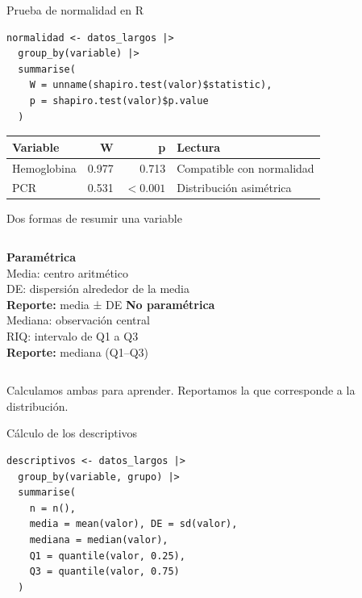 \documentclass[aspectratio=169,11pt]{beamer}
\begin{document}
\begin{frame}[fragile]{Prueba de normalidad en R}
\begin{lstlisting}[basicstyle=\ttfamily\footnotesize]
normalidad <- datos_largos |>
  group_by(variable) |>
  summarise(
    W = unname(shapiro.test(valor)$statistic),
    p = shapiro.test(valor)$p.value
  )
\end{lstlisting}

\vspace{0.25cm}
\begin{tabular}{lrrl}
\toprule
Variable & W & p & Lectura\\
\midrule
Hemoglobina & 0.977 & 0.713 & Compatible con normalidad\\
PCR & 0.531 & $<0.001$ & Distribución asimétrica\\
\bottomrule
\end{tabular}
\end{frame}

\begin{frame}{Dos formas de resumir una variable}
\begin{columns}[T,onlytextwidth]
  {\color{verde}\Large\textbf{Paramétrica}}\\[0.3cm]
  Media: centro aritmético\\
  DE: dispersión alrededor de la media\\[0.35cm]
  \textbf{Reporte:} media ± DE
  {\color{naranja}\Large\textbf{No paramétrica}}\\[0.3cm]
  Mediana: observación central\\
  RIQ: intervalo de Q1 a Q3\\[0.35cm]
  \textbf{Reporte:} mediana (Q1--Q3)
\end{columns}

\vspace{0.8cm}
\centering
\large Calculamos ambas para aprender. Reportamos la que corresponde a la distribución.
\end{frame}

\begin{frame}[fragile]{Cálculo de los descriptivos}
\begin{lstlisting}[basicstyle=\ttfamily\footnotesize]
descriptivos <- datos_largos |>
  group_by(variable, grupo) |>
  summarise(
    n = n(),
    media = mean(valor), DE = sd(valor),
    mediana = median(valor),
    Q1 = quantile(valor, 0.25),
    Q3 = quantile(valor, 0.75)
  )
\end{lstlisting}
\end{frame}
\end{document}
